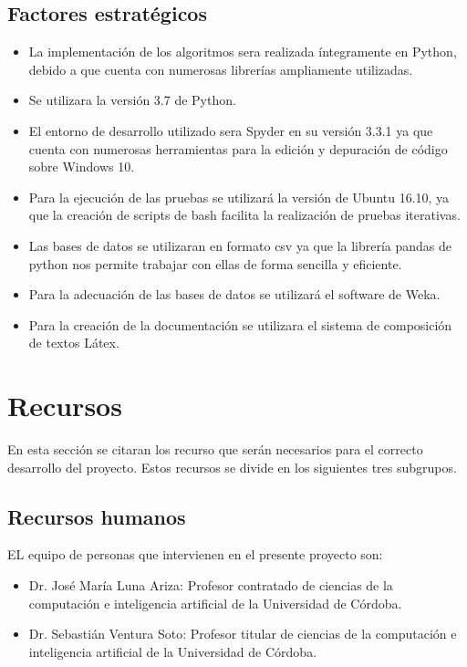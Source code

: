 \documentclass[a4paper,12pt,twoside,final]{book}
\begin{document}
\subsection{Factores estratégicos}
\begin{itemize}

\item La implementación de los algoritmos sera realizada íntegramente en Python, debido a que cuenta con numerosas librerías ampliamente utilizadas.

\item Se utilizara la versión 3.7 de Python.

\item El entorno de desarrollo utilizado sera Spyder en su versión 3.3.1 ya que cuenta con numerosas herramientas para la edición y depuración de código sobre Windows 10.

\item Para la ejecución de las pruebas se utilizará la versión de Ubuntu 16.10, ya que la creación de scripts de bash facilita la realización de pruebas iterativas.

\item Las bases de datos se utilizaran en formato csv ya que la librería pandas de python nos permite trabajar con ellas de forma sencilla y eficiente.

\item Para la adecuación de las bases de datos se utilizará el software de Weka.

\item Para la creación de la documentación se utilizara el sistema de composición de textos Látex.

\end{itemize}

\newpage
\section{Recursos}
En esta sección se citaran los recurso que serán necesarios para el correcto desarrollo del proyecto. Estos recursos se divide en los siguientes tres subgrupos.
\subsection{Recursos humanos}

EL equipo de personas que intervienen en el presente proyecto son:
\begin{itemize}

    \item Dr. José María Luna Ariza: Profesor contratado de ciencias de la computación e inteligencia artificial de la Universidad de Córdoba.
    
    \item Dr. Sebastián Ventura Soto: Profesor titular de ciencias de la computación e inteligencia artificial de la Universidad de Córdoba.
    
\end{itemize}
\end{document}
